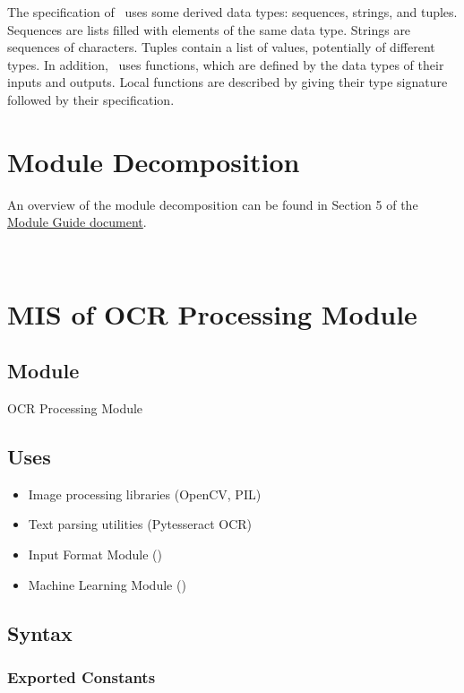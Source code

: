 \documentclass[12pt, titlepage]{article}
\begin{document}
\noindent
The specification of \progname \ uses some derived data types: sequences, strings, and
tuples. Sequences are lists filled with elements of the same data type. Strings
are sequences of characters. Tuples contain a list of values, potentially of
different types. In addition, \progname \ uses functions, which
are defined by the data types of their inputs and outputs. Local functions are
described by giving their type signature followed by their specification.

\section{Module Decomposition}

An overview of the module decomposition can be found in Section 5 of the
\href{https://github.com/smiths/capTemplate/blob/main/docs/Design/SoftArchitecture/MG.pdf}{Module
Guide document}.


~\newpage

\section{MIS of OCR Processing Module}\label{OCR_Processing_Module}

\subsection{Module}

OCR Processing Module

\subsection{Uses}

\begin{itemize}
  \item Image processing libraries (OpenCV, PIL)
  \item Text parsing utilities (Pytesseract OCR)
  \item Input Format Module ()
  \item Machine Learning Module ()
\end{itemize}

\subsection{Syntax}

\subsubsection{Exported Constants}
\end{document}
